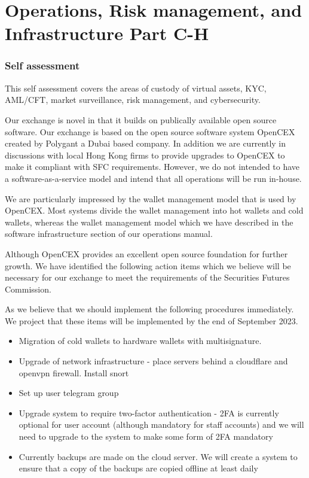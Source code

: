 \documentclass[]{report}
\begin{document}
\chapter{Operations, Risk management, and Infrastructure Part C-H}

\subsection{Self assessment}

This self assessment covers the areas of custody of virtual assets,
KYC, AML/CFT, market surveillance, risk management, and cybersecurity.

Our exchange is novel in that it builds on publically available open
source software.  Our exchange is based on the open source software
system OpenCEX created by Polygant a Dubai based company.  In addition
we are currently in discussions with local Hong Kong firms to provide
upgrades to OpenCEX to make it compliant with SFC requirements.
However, we do not intended to have a software-as-a-service model and
intend that all operations will be run in-house.

We are particularly impressed by the wallet management model that is
used by OpenCEX.  Most systems divide the wallet management into hot
wallets and cold wallets, whereas the wallet management model which we
have described in the software infrastructure section of our
operations manual.

Although OpenCEX provides an excellent open source foundation for
further growth.  We have identified the following action items which
we believe will be necessary for our exchange to meet the requirements
of the Securities Futures Commission.

As we believe that we should implement the following procedures
immediately.  We project that these items will be implemented by the
end of September 2023.

\begin{itemize}
\item Migration of cold wallets to hardware wallets with
  multisignature.

\item Upgrade of network infrastructure - place servers behind a cloudflare and
openvpn firewall.  Install snort

\item Set up user telegram group

\item Upgrade system to require two-factor authentication - 2FA is
  currently optional for user account (although mandatory for staff
  accounts) and we will need to upgrade to the system to make
  some form of 2FA mandatory

\item Currently backups are made on the cloud server.  We will create
  a system to ensure that a copy of the backups are copied offline at
  least daily
\end{itemize}
\end{document}
